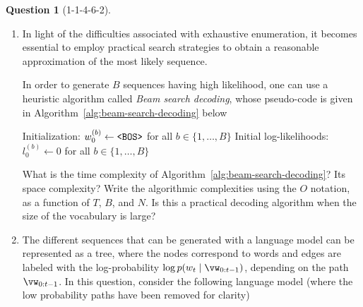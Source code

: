 \documentclass[12pt]{article}
\theoremstyle{definition}
\newtheorem{exercise}{Question}%
\begin{document}
\begin{exercise}[1-1-4-6-2]
{\begin{enumerate}[label=\arabic{exercise}.\arabic*]
    \item In light of the difficulties associated with exhaustive enumeration, it becomes essential to employ practical search strategies to obtain a reasonable approximation of the most likely sequence.
    
    In order to generate $B$ sequences having high likelihood, one can use a heuristic algorithm called \emph{Beam search decoding}, whose pseudo-code is given in Algorithm~\ref{alg:beam-search-decoding} below

    \begin{minipage}{\linewidth}
    \begin{algorithm}[H]
    \DontPrintSemicolon
    Initialization: $w_{0}^{(b)} \leftarrow \textrm{\texttt{<BOS>}}$ for all $b \in \{1,\ldots,B\}$\;
    Initial log-likelihoods: $l_{0}^{(b)} \leftarrow 0$ for all $b \in \{1,\ldots,B\}$\;
    \caption{Beam search decoding}
    \label{alg:beam-search-decoding}
    \end{algorithm}
    \end{minipage}
    
    What is the time complexity of Algorithm~\ref{alg:beam-search-decoding}? Its space complexity? Write the algorithmic complexities using the $O$ notation, as a function of $T$, $B$, and $N$. Is this a practical decoding algorithm when the size of the vocabulary is large?

    
    \item The different sequences that can be generated with a language model can be represented as a tree, where the nodes correspond to words and edges are labeled with the log-probability $\log p(w_{t}\mid \vw_{0:t-1})$, depending on the path $\vw_{0:t-1}$. In this question, consider the following language model (where the low probability paths have been removed for clarity)


\end{enumerate}}
\end{exercise}
\end{document}
